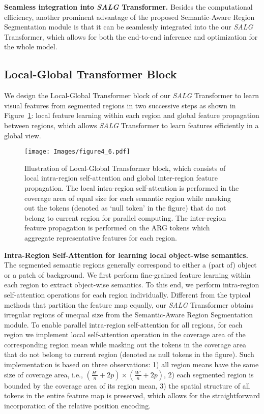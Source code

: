 \smallskip\noindent\textbf{Seamless integration into \emph{SALG} Transformer.} Besides the computational efficiency, another prominent advantage of the proposed Semantic-Aware Region Segmentation module is that it can be seamlessly integrated into the our \emph{SALG} Transformer, which allows for both the end-to-end inference and optimization for the whole model.


\subsection{Local-Global Transformer Block}
\label{sec:3.3}
We design the Local-Global Transformer block of our \emph{SALG} Transformer to learn visual features from segmented regions in two successive steps as shown in Figure~\ref{fig:local-global}: local feature learning within each region and global feature propagation between regions, which allows \emph{SALG} Transformer to learn features efficiently in a global view.


\begin{figure}[!t]
\centering
\texttt{[image: Images/figure4\_6.pdf]}
\caption{Illustration of Local-Global Transformer block, which consists of local intra-region self-attention and global inter-region feature propagation. The local intra-region self-attention is performed in the coverage area of equal size for each semantic region while masking out the tokens (denoted as `null token' in the figure) that do not belong to current region for parallel computing. The inter-region feature propagation is performed on the ARG tokens which aggregate representative features for each region.}
\label{fig:local-global}
\end{figure}

\smallskip\noindent\textbf{Intra-Region Self-Attention for learning local object-wise semantics.}
The segmented semantic regions generally correspond to either a (part of) object or a patch of background. We first perform fine-grained feature learning within each region to extract object-wise semantics. To this end, we perform intra-region self-attention operations for each region individually. Different from the typical methods that partition the feature map equally, our \emph{SALG} Transformer obtains irregular regions of unequal size from the Semantic-Aware Region Segmentation module. To enable parallel intra-region self-attention for all regions, for each region we implement local self-attention operation in the coverage area of the corresponding region mean while masking out the tokens in the coverage area that do not belong to current region (denoted as null tokens in the figure). Such implementation is based on three observations: 1) all region means have the same size of coverage area, i.e., $(\frac{H'}{n}+2p) \times (\frac{W'}{n}+2p)$, 2) each segmented region is bounded by the coverage area of its region mean, 3) the spatial structure of all tokens in the entire feature map is preserved, which allows for the straightforward incorporation of the relative position encoding.


